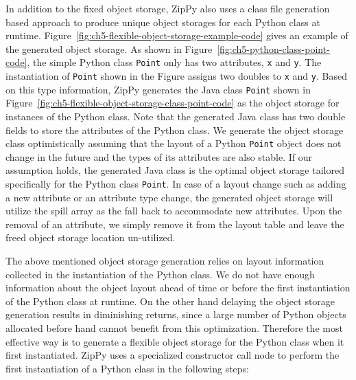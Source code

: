 In addition to the fixed object storage, ZipPy also uses a class file generation based approach to produce unique object storages for each Python class at runtime.
Figure~\ref{fig:ch5-flexible-object-storage-example-code} gives an example of the generated object storage.
As shown in Figure~\ref{fig:ch5-python-class-point-code}, the simple Python class \texttt{Point} only has two attributes, \texttt{x} and \texttt{y}.
The instantiation of \texttt{Point} shown in the Figure assigns two doubles to \texttt{x} and \texttt{y}.
Based on this type information, ZipPy generates the Java class \texttt{Point} shown in Figure~\ref{fig:ch5-flexible-object-storage-class-point-code} as the object storage for instances of the Python class.
Note that the generated Java class has two double fields to store the attributes of the Python class.
We generate the object storage class optimistically assuming that the layout of a Python \texttt{Point} object does not change in the future and the types of its attributes are also stable.
If our assumption holds, the generated Java class is the optimal object storage tailored specifically for the Python class \texttt{Point}.
In case of a layout change such as adding a new attribute or an attribute type change, the generated object storage will utilize the spill array as the fall back to accommodate new attributes.
Upon the removal of an attribute, we simply remove it from the layout table and leave the freed object storage location un-utilized.

The above mentioned object storage generation relies on layout information collected in the instantiation of the Python class.
We do not have enough information about the object layout ahead of time or before the first instantiation of the Python class at runtime.
On the other hand delaying the object storage generation results in diminishing returns, since a large number of Python objects allocated before hand cannot benefit from this optimization.
Therefore the most effective way is to generate a flexible object storage for the Python class when it first instantiated.
ZipPy uses a specialized constructor call node to perform the first instantiation of a Python class in the following steps:

